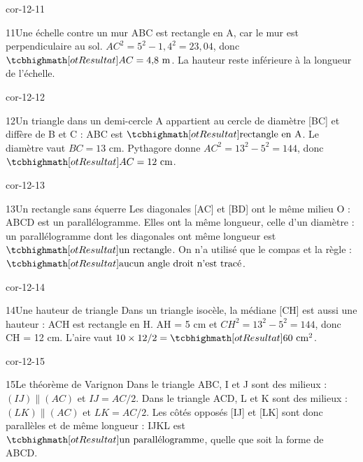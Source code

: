 \begin{blocLivre}{cor-12-11}\begin{corrige}{11}{Une échelle contre un mur}
ABC est rectangle en A, car le mur est perpendiculaire au sol. $AC^2=5^2-1{,}4^2=23{,}04$, donc $\res{AC=4{,}8\text{ m}}$. La hauteur reste inférieure à la longueur de l’échelle.
\label{fig-cor-12-11}
\end{corrige}\end{blocLivre}
\begin{blocLivre}{cor-12-12}\begin{corrige}{12}{Un triangle dans un demi-cercle}
A appartient au cercle de diamètre [BC] et diffère de B et C : ABC est $\res{\text{rectangle en A}}$. Le diamètre vaut $BC=13$ cm. Pythagore donne $AC^2=13^2-5^2=144$, donc $\res{AC=12\text{ cm}}$.
\label{fig-cor-12-12}
\end{corrige}\end{blocLivre}
\begin{blocLivre}{cor-12-13}\begin{corrige}{13}{Un rectangle sans équerre}
Les diagonales [AC] et [BD] ont le même milieu O : ABCD est un parallélogramme. Elles ont la même longueur, celle d’un diamètre : un parallélogramme dont les diagonales ont même longueur est $\res{\text{un rectangle}}$. On n’a utilisé que le compas et la règle : $\res{\text{aucun angle droit n’est tracé}}$.
\label{fig-cor-12-13}
\end{corrige}\end{blocLivre}
\begin{blocLivre}{cor-12-14}\begin{corrige}{14}{Une hauteur de triangle}
Dans un triangle isocèle, la médiane [CH] est aussi une hauteur : ACH est rectangle en H. AH = 5 cm et $CH^2=13^2-5^2=144$, donc CH = 12 cm. L’aire vaut $10\times12/2=\res{60\text{ cm}^2}$.
\label{fig-cor-12-14}
\end{corrige}\end{blocLivre}
\begin{blocLivre}{cor-12-15}\begin{corrige}{15}{Le théorème de Varignon}
Dans le triangle ABC, I et J sont des milieux : $(IJ)\parallel(AC)$ et $IJ=AC/2$. Dans le triangle ACD, L et K sont des milieux : $(LK)\parallel(AC)$ et $LK=AC/2$. Les côtés opposés [IJ] et [LK] sont donc parallèles et de même longueur : IJKL est $\res{\text{un parallélogramme}}$, quelle que soit la forme de ABCD.
\label{fig-cor-12-15}
\end{corrige}\end{blocLivre}
